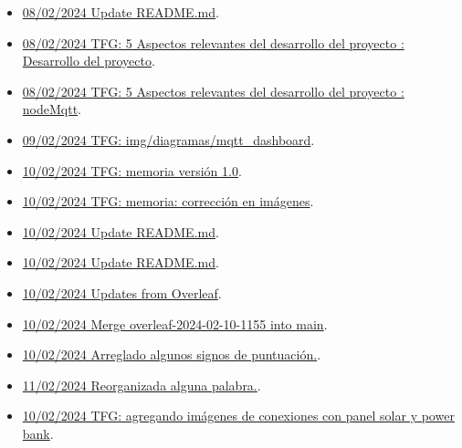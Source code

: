 \begin{itemize}
\item \href{https://github.com/JLCaballeroMQ/Proyecto_TFG_UBU_23_24/tree/e5ac575f3fce1c5500eecff950262c167f4f1f27}{08/02/2024 Update README.md}.
\item \href{https://github.com/JLCaballeroMQ/Proyecto_TFG_UBU_23_24/tree/83b01796fcb289cfbbad15325818337bec673c15}{08/02/2024 TFG: 5 Aspectos relevantes del desarrollo del proyecto : Desarrollo del proyecto}.
\item \href{https://github.com/JLCaballeroMQ/Proyecto_TFG_UBU_23_24/tree/820d41d9b8c12feebfd888284f5092b0cdb4a5d9}{08/02/2024 TFG: 5 Aspectos relevantes del desarrollo del proyecto : nodeMqtt}.
\item \href{https://github.com/JLCaballeroMQ/Proyecto_TFG_UBU_23_24/tree/47b47e62048565810554d1c032ab05e6a67d988a}{09/02/2024 TFG: img/diagramas/mqtt_dashboard}.
\item \href{https://github.com/JLCaballeroMQ/Proyecto_TFG_UBU_23_24/tree/7e8a8983c869a0ef0121474e72d7ab7e12168334}{10/02/2024 TFG: memoria versión 1.0}.
\item \href{https://github.com/JLCaballeroMQ/Proyecto_TFG_UBU_23_24/tree/161f11abf555dad180d3d8a4b40c16ac81595fb8}{10/02/2024 TFG: memoria: corrección en imágenes}.
\item \href{https://github.com/JLCaballeroMQ/Proyecto_TFG_UBU_23_24/tree/13e20134718d089b9d23207e337eb2c6ed8258e1}{10/02/2024 Update README.md}.
\item \href{https://github.com/JLCaballeroMQ/Proyecto_TFG_UBU_23_24/tree/6c1b5349a823cc5d38e134745c6d38e9e6bffe0b}{10/02/2024 Update README.md}.
\item \href{https://github.com/JLCaballeroMQ/Proyecto_TFG_UBU_23_24/tree/a8406bb330e77d91a7a2236f4ff7f77b1768cbf3}{10/02/2024 Updates from Overleaf}.
\item \href{https://github.com/JLCaballeroMQ/Proyecto_TFG_UBU_23_24/tree/7dd0effa00fe1c8c3b38574728d670944abc0b38}{10/02/2024 Merge overleaf-2024-02-10-1155 into main}.
\item \href{https://github.com/JLCaballeroMQ/Proyecto_TFG_UBU_23_24/tree/28a88a6776a791bdecaaba6a50a050613466b61b}{10/02/2024 Arreglado algunos signos de puntuación.}.
\item \href{https://github.com/JLCaballeroMQ/Proyecto_TFG_UBU_23_24/tree/3074c8d5e438d78e70626581e251c3f0155d32b1}{11/02/2024 Reorganizada alguna palabra.}.
\item \href{https://github.com/JLCaballeroMQ/Proyecto_TFG_UBU_23_24/tree/d9175d599577b1bd82e95d79df468241578db6c8}{10/02/2024 TFG: agregando imágenes de conexiones con panel solar y power bank}.

\end{itemize}

